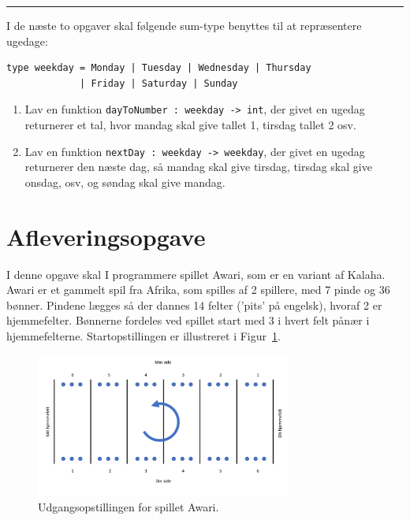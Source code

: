 \documentclass[a4paper,12pt]{article}
\begin{document}
\newpage
\begin{center}
\rule{0.5\linewidth}{0.4pt}
\end{center}
I de næste to opgaver skal følgende sum-type benyttes til at
repræsentere ugedage:

\begin{lstlisting}[numbers=none,frame=none,mathescape]
type weekday = Monday | Tuesday | Wednesday | Thursday
             | Friday | Saturday | Sunday
\end{lstlisting}

\begin{enumerate}[label=7ø.\arabic*,start=5]
\item Lav en funktion \texttt{dayToNumber : weekday -> int}, der givet
  en ugedag returnerer et tal, hvor mandag skal give tallet 1, tirsdag
  tallet 2 osv.

\item Lav en funktion \texttt{nextDay : weekday -> weekday}, der givet
  en ugedag returnerer den næste dag, så mandag skal give tirsdag,
  tirsdag skal give onsdag, osv, og søndag skal give mandag.
\end{enumerate}


\section*{Afleveringsopgave}
I denne opgave skal I programmere spillet Awari, som er en variant af
Kalaha. Awari er et gammelt spil fra Afrika, som spilles af 2
spillere, med 7 pinde og 36 bønner. Pindene lægges så der dannes 14
felter ('pits' på engelsk), hvoraf 2 er hjemmefelter.  Bønnerne
fordeles ved spillet start med 3 i hvert felt pånær i
hjemmefelterne. Startopstillingen er illustreret i
Figur~\ref{fig:awari}.
\begin{figure}[h]
  \centering
  \includegraphics[width=0.75\textwidth]{awari.pdf}
  \caption{Udgangsopstillingen for spillet Awari.}
  \label{fig:awari}
\end{figure}
\end{document}
